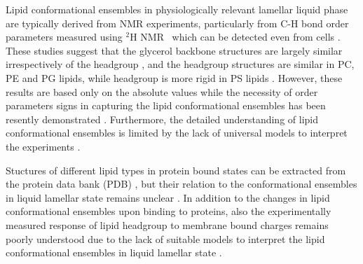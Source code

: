 \documentclass[aps,prl,superscriptaddress,twocolumn]{revtex4}
\begin{document}
Lipid conformational ensembles in physiologically relevant lamellar liquid phase
are typically derived from NMR experiments, particularly from 
C-H bond order parameters measured using $^2$H NMR~\cite{seelig77c,davis83,Semchyschyn04}
which can be detected even from cells \cite{gally81,scherer87,seelig90}.
These studies suggest that the glycerol backbone structures are largely similar irrespectively of the headgroup \cite{gally81}, 
and the headgroup structures are similar in PC, PE and PG lipids, while headgroup is more rigid in PS lipids \cite{wohlgemuth80,buldt81}. 
However, these results are based only on the absolute values while 
the necessity of order parameters signs in capturing the lipid conformational ensembles has been resently demonstrated \cite{botan15,ollila16,ferreira16}.
Furthermore, the detailed understanding of lipid conformational ensembles
is limited by the lack of universal models to interpret the experiments \cite{pezeshkian18,akutsu20}.

Stuctures of different lipid types in protein bound states can be extracted from the protein data bank (PDB) \cite{berman00},
but their relation to the conformational ensembles in liquid lamellar state remains unclear \cite{marsh13b}.
In addition to the changes in lipid conformational ensembles upon binding to proteins,
also the experimentally measured response of lipid headgroup to membrane bound charges remains poorly understood 
due to the lack of suitable models to interpret the lipid conformational ensembles in liquid lamellar state \cite{Semchyschyn04}.
\end{document}
